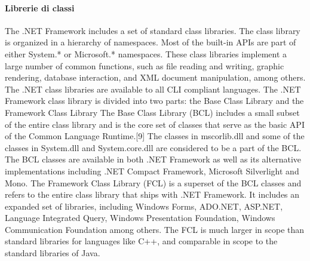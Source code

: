 \paragraph{Librerie di classi}
The .NET Framework includes a set of standard class libraries. The class library is organized in a hierarchy of namespaces. Most of the built-in APIs are part of either System.* or Microsoft.* namespaces. These class libraries implement a large number of common functions, such as file reading and writing, graphic rendering, database interaction, and XML document manipulation, among others. The .NET class libraries are available to all CLI compliant languages. The .NET Framework class library is divided into two parts: the Base Class Library and the Framework Class Library
The Base Class Library (BCL) includes a small subset of the entire class library and is the core set of classes that serve as the basic API of the Common Language Runtime.[9] The classes in mscorlib.dll and some of the classes in System.dll and System.core.dll are considered to be a part of the BCL. The BCL classes are available in both .NET Framework as well as its alternative implementations including .NET Compact Framework, Microsoft Silverlight and Mono.
The Framework Class Library (FCL) is a superset of the BCL classes and refers to the entire class library that ships with .NET Framework. It includes an expanded set of libraries, including Windows Forms, ADO.NET, ASP.NET, Language Integrated Query, Windows Presentation Foundation, Windows Communication Foundation among others. The FCL is much larger in scope than standard libraries for languages like C++, and comparable in scope to the standard libraries of Java.
